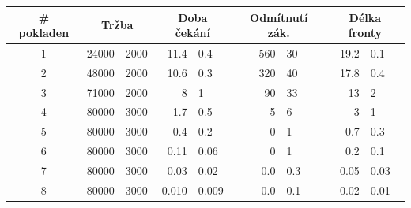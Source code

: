 \documentclass[a4paper,12pt]{article}
\begin{document}
\begin{tabular}{c|r@{$\pm$}l|r@{$\pm$}l|r@{$\pm$}l|r@{$\pm$}l}
	\# pokladen & \multicolumn{2}{|c|}{Tržba} & \multicolumn{2}{|c|}{Doba čekání} & \multicolumn{2}{|c|}{Odmítnutí zák.} & \multicolumn{2}{|c}{Délka fronty}\\ \hline\hline	
	1 &   24000 & 2000  &   11.4   &  0.4    &  560   & 30    &  19.2  & 0.1  \\
	2 &   48000 & 2000  &   10.6   &  0.3    &  320   & 40    &  17.8  & 0.4  \\
	3 &   71000 & 2000  &    8     &  1      &   90   & 33    &  13    & 2    \\
	4 &   80000 & 3000  &    1.7   &  0.5    &    5   &  6    &   3    & 1    \\
	5 &   80000 & 3000  &    0.4   &  0.2    &    0   &  1    &   0.7  & 0.3  \\
	6 &   80000 & 3000  &    0.11  &  0.06   &    0   &  1    &   0.2  & 0.1  \\
	7 &   80000 & 3000  &    0.03  &  0.02   &    0.0 &  0.3  &   0.05 & 0.03 \\
	8 &   80000 & 3000  &    0.010 &  0.009  &    0.0 &  0.1  &   0.02 & 0.01 
\end{tabular}
\end{document}
